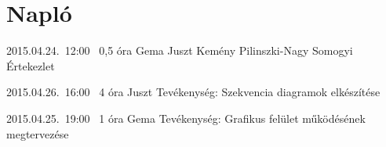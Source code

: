 %
\section{Napló}

\begin{naplo}

\bejegyzes
{2015.04.24.~12:00~} %
{0,5 óra} %
{Gema\newline
Juszt\newline
Kemény\newline
Pilinszki-Nagy\newline
Somogyi} %
{Értekezlet} %

\bejegyzes
{2015.04.26.~16:00~}
{4 óra}
{Juszt}
{Tevékenység: Szekvencia diagramok elkészítése}

\bejegyzes
{2015.04.25.~19:00~}
{1 óra}
{Gema}
{Tevékenység: Grafikus felület működésének megtervezése}





\end{naplo}


